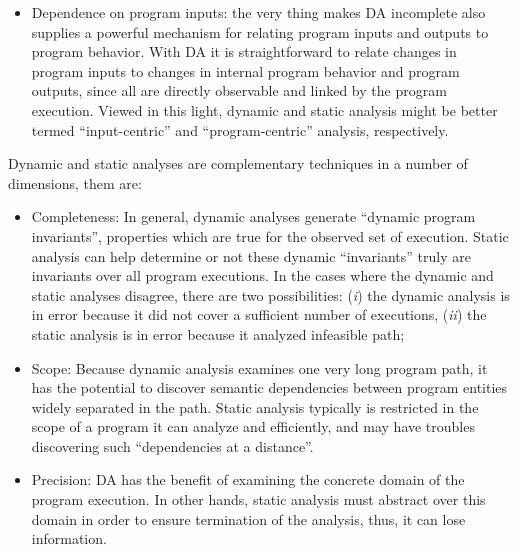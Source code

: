 \begin{itemize}
\begin{itemize}
\item Dependence on program inputs: the very thing makes DA incomplete also supplies a powerful mechanism for relating program inputs and outputs to program behavior. With DA it is straightforward to relate changes in program inputs to changes in internal program behavior and program outputs, since all are directly observable and linked by the program execution. Viewed in this light, dynamic and static analysis might be better termed ``input-centric'' and ``program-centric'' analysis, respectively.
 

\end{itemize}

Dynamic and static analyses are complementary techniques in a number of dimensions, them are: 

\begin{itemize}

\item Completeness: In general, dynamic analyses generate ``dynamic program invariants'', properties which are true for the observed set of execution. Static analysis can help determine or not these dynamic ``invariants'' truly are invariants over all program executions. In the cases where the dynamic and static analyses disagree, there are two possibilities: (\textit{i}) the dynamic analysis is in error because it did not cover a sufficient number of executions, (\textit{ii}) the static analysis is in error because it analyzed infeasible path;

\item Scope: Because dynamic analysis examines one very long program path, it has the potential to discover semantic dependencies between program entities widely separated in the path. Static analysis typically is restricted in the scope of a program it can analyze and efficiently, and may have troubles discovering such ``dependencies at a distance''.

\item Precision:  DA has the benefit of examining the concrete domain of the program execution. In other hands, static analysis must abstract over this domain in order to ensure termination of the analysis, thus, it can lose information. 

\end{itemize}


\end{itemize}

